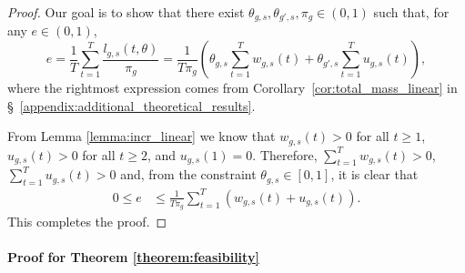 \documentclass[letterpaper]{article} %
\begin{document}
\begin{proof}

Our goal is to show that there exist $\theta_{g,s}, \theta_{g',s}, \pi_g \in (0,1)$ such that, for any $e \in (0,1)$,
\begin{equation*}
    e = \frac{1}{T}\sum_{t=1}^T\frac{l_{g,s}(t,\theta)}{\pi_g} = \frac{1}{T \pi_g} \left(\theta_{g,s}\sum_{t=1}^T w_{g,s}(t) + \theta_{g',s}\sum_{t=1}^T u_{g,s}(t) \right),
\end{equation*}
where the rightmost expression comes from Corollary~\ref{cor:total_mass_linear} in \S~\ref{appendix:additional_theoretical_results}. 

From Lemma \ref{lemma:incr_linear} we know that $w_{g,s}(t) > 0$ for all $t\geq 1$, $u_{g,s}(t) > 0$ for all $t\geq 2$, and $u_{g,s}(1) = 0$. Therefore, $\sum_{t=1}^T w_{g,s}(t) > 0$, $\sum_{t=1}^T u_{g,s}(t) > 0$ and, from the constraint $\theta_{g,s} \in [0,1]$, it is clear that
\begin{align}
    0 \leq e &\leq \frac{1}{T \pi_g} \sum_{t=1}^T \left(w_{g,s}(t) + u_{g,s}(t) \right). \label{eqn:e_bounds}
\end{align}
This completes the proof.
\end{proof}

\paragraph{Proof for Theorem \ref{theorem:feasibility}}
\end{document}
